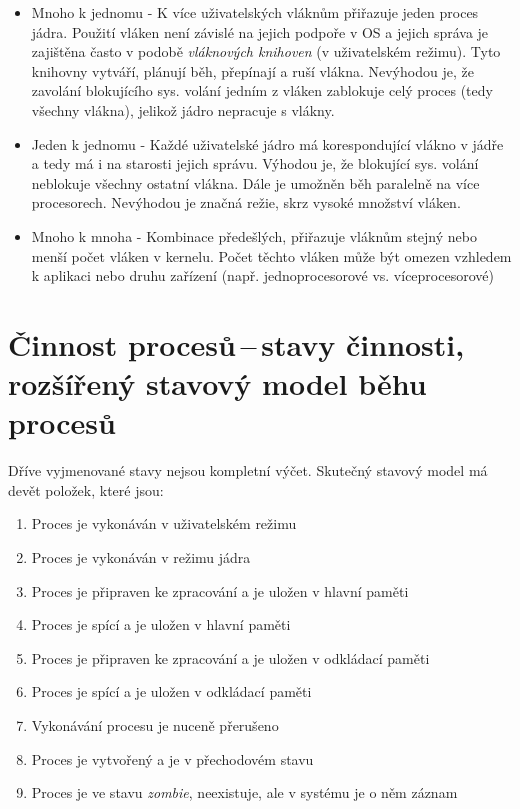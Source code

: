 \begin{itemize}
    \item Mnoho k jednomu - K více uživatelských vláknům přiřazuje jeden proces jádra. Použití vláken není závislé na jejich podpoře v OS a jejich správa je zajištěna často v podobě \textit{vláknových knihoven} (v uživatelském režimu). Tyto knihovny vytváří, plánují běh, přepínají a ruší vlákna. Nevýhodou je, že zavolání blokujícího sys. volání jedním z vláken zablokuje celý proces (tedy všechny vlákna), jelikož jádro nepracuje s vlákny.  
    \item Jeden k jednomu - Každé uživatelské jádro má korespondující vlákno v jádře a tedy má i na starosti jejich správu. Výhodou je, že blokující sys. volání neblokuje všechny ostatní vlákna. Dále je umožněn běh paralelně na více procesorech. Nevýhodou je značná režie, skrz vysoké množství vláken.
    \item Mnoho k mnoha - Kombinace předešlých, přiřazuje vláknům stejný nebo menší počet vláken v kernelu. Počet těchto vláken může být omezen vzhledem k aplikaci nebo druhu zařízení (např. jednoprocesorové vs. víceprocesorové)
\end{itemize}


\newpage
\section{Činnost procesů\,--\,stavy činnosti, rozšířený stavový model běhu procesů} \label{proces-work}

Dříve vyjmenované stavy nejsou kompletní výčet. Skutečný stavový model má devět položek, které jsou:

\begin{enumerate}
    \item Proces je vykonáván v uživatelském režimu
    \item Proces je vykonáván v režimu jádra
    \item Proces je připraven ke zpracování a je uložen v hlavní paměti
    \item Proces je spící a je uložen v hlavní paměti
    \item Proces je připraven ke zpracování a je uložen v odkládací paměti
    \item Proces je spící a je uložen v odkládací paměti
    \item Vykonávání procesu je nuceně přerušeno
    \item Proces je vytvořený a je v přechodovém stavu
    \item Proces je ve stavu \textit{zombie}, neexistuje, ale v systému je o něm záznam 
\end{enumerate}

